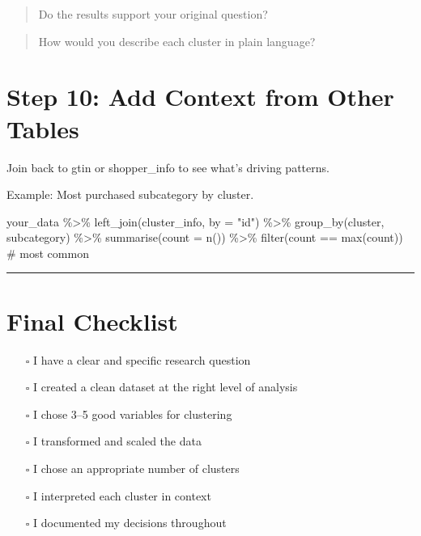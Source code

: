 \documentclass[
  11pt,
]{article}
\newenvironment{Shaded}{\begin{snugshade}}{\end{snugshade}}
\newcommand{\AttributeTok}[1]{\textcolor[rgb]{0.40,0.45,0.13}{#1}}
\newcommand{\CommentTok}[1]{\textcolor[rgb]{0.37,0.37,0.37}{#1}}
\newcommand{\FunctionTok}[1]{\textcolor[rgb]{0.28,0.35,0.67}{#1}}
\newcommand{\NormalTok}[1]{\textcolor[rgb]{0.00,0.23,0.31}{#1}}
\newcommand{\SpecialCharTok}[1]{\textcolor[rgb]{0.37,0.37,0.37}{#1}}
\newcommand{\StringTok}[1]{\textcolor[rgb]{0.13,0.47,0.30}{#1}}
\begin{document}
\begin{quote}
Do the results support your original question?
\end{quote}

\vspace{2em}

\begin{quote}
How would you describe each cluster in plain language?
\end{quote}

\vspace{2em}

\newpage

\section*{Step 10: Add Context from Other
Tables}\label{step-10-add-context-from-other-tables}

Join back to gtin or shopper\_info to see what's driving patterns.

Example: Most purchased subcategory by cluster.

\begin{Shaded}
\begin{Highlighting}[]
\NormalTok{your\_data }\SpecialCharTok{\%\textgreater{}\%}
  \FunctionTok{left\_join}\NormalTok{(cluster\_info, }\AttributeTok{by =} \StringTok{"id"}\NormalTok{) }\SpecialCharTok{\%\textgreater{}\%}
  \FunctionTok{group\_by}\NormalTok{(cluster, subcategory) }\SpecialCharTok{\%\textgreater{}\%}
  \FunctionTok{summarise}\NormalTok{(}\AttributeTok{count =} \FunctionTok{n}\NormalTok{()) }\SpecialCharTok{\%\textgreater{}\%}
  \FunctionTok{filter}\NormalTok{(count }\SpecialCharTok{==} \FunctionTok{max}\NormalTok{(count))  }\CommentTok{\# most common}
\end{Highlighting}
\end{Shaded}

\begin{center}\rule{0.5\linewidth}{0.5pt}\end{center}

\section*{Final Checklist}\label{final-checklist}

\begin{itemize}
\item[$\square$]
  I have a clear and specific research question
\item[$\square$]
  I created a clean dataset at the right level of analysis
\item[$\square$]
  I chose 3--5 good variables for clustering
\item[$\square$]
  I transformed and scaled the data
\item[$\square$]
  I chose an appropriate number of clusters
\item[$\square$]
  I interpreted each cluster in context
\item[$\square$]
  I documented my decisions throughout
\end{itemize}
\end{document}
